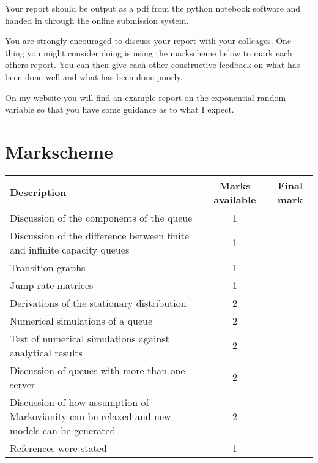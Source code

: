 \documentclass[paper=a4, fontsize=11pt]{scrartcl}
\numberwithin{equation}{section}
\numberwithin{figure}{section}
\numberwithin{table}{section}
\begin{document}
Your report should be output as a pdf from the python notebook software and handed in through the online submission system.

You are strongly encouraged to discuss your report with your colleages.  One thing you might consider doing is using the markscheme below to mark each others report.  You can then give each other 
constructive feedback on what has been done well and what has been done poorly.

On my website you will find an example report on the exponential random variable so that you have some guidance as to what I expect.

\section{Markscheme}

\begin{center}
\begin{tabular}{ l | c | c }
Description & Marks available & Final mark \\ \hline
Discussion of the components of the queue & 1 & \\
Discussion of the difference between finite and infinite capacity queues & 1 & \\
Transition graphs & 1 & \\
Jump rate matrices & 1 & \\
Derivations of the stationary distribution & 2 & \\
Numerical simulations of a queue & 2 & \\
Test of numerical simulations against analytical results & 2 & \\
Discussion of queues with more than one server & 2 & \\
Discussion of how assumption of Markovianity can be relaxed and new models can be generated & 2 & \\
References were stated & 1 
\end{tabular}
\end{center}
\end{document}
